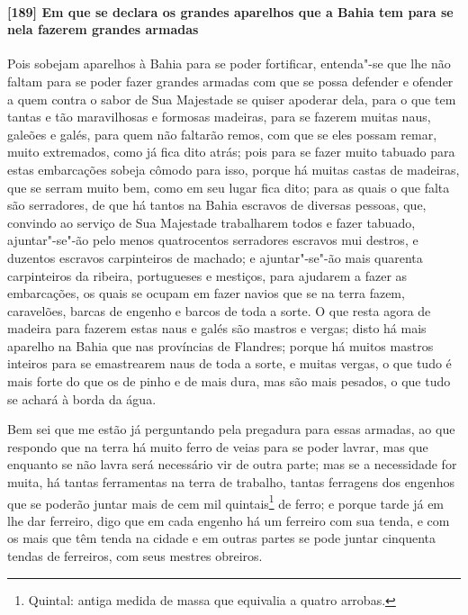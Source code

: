 \begin{linenumbers}
\paragraph{[189] Em que se declara os grandes aparelhos que a Bahia tem para se nela fazerem
grandes armadas}\quad
Pois sobejam aparelhos à Bahia para se poder fortificar, entenda"-se que lhe não faltam
para se poder fazer grandes armadas com que se possa defender e ofender a quem contra o
sabor de Sua Majestade se quiser apoderar dela, para o que tem tantas e tão maravilhosas e
formosas madeiras, para se fazerem muitas naus, galeões e galés, para quem não faltarão
remos, com que se eles possam remar, muito extremados, como já fica dito atrás; pois para
se fazer muito tabuado para estas embarcações sobeja cômodo para isso, porque há muitas
castas de madeiras, que se serram muito bem, como em seu lugar fica dito; para as quais o
que falta são serradores, de que há tantos na Bahia escravos de diversas pessoas, que,
convindo ao serviço de Sua Majestade trabalharem todos e fazer tabuado, ajuntar"-se"-ão pelo
menos quatrocentos serradores escravos mui destros, e duzentos escravos carpinteiros de
machado; e ajuntar"-se"-ão mais quarenta carpinteiros da ribeira, portugueses e mestiços,
para ajudarem a fazer as embarcações, os quais se ocupam em fazer navios que se na terra
fazem, caravelões, barcas de engenho e barcos de toda a sorte. O que resta agora de
madeira para fazerem estas naus e galés são mastros e vergas; disto há mais aparelho na
Bahia que nas províncias de Flandres; porque há muitos mastros inteiros para se
emastrearem naus de toda a sorte, e muitas vergas, o que tudo é mais forte do que os de
pinho e de mais dura, mas são mais pesados, o que tudo se achará à borda da água.

Bem sei que me estão já perguntando pela pregadura para essas armadas, ao que respondo que
na terra há muito ferro de veias para se poder lavrar, mas que enquanto se não lavra será
necessário vir de outra parte; mas se a necessidade for muita, há tantas ferramentas na
terra de trabalho, tantas ferragens dos engenhos que se poderão juntar mais de cem mil
quintais\footnote{ Quintal: antiga medida de massa que equivalia a quatro arrobas.} de ferro; e
porque tarde já em lhe dar ferreiro, digo que em cada engenho há um ferreiro com sua
tenda, e com os mais que têm tenda na cidade e em outras partes se pode juntar cinquenta
tendas de ferreiros, com seus mestres obreiros.


\end{linenumbers}
